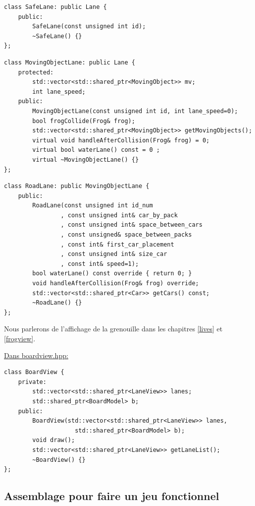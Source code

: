\documentclass[a4paper, 12pt]{article}
\begin{document}
\begin{lstlisting}
class SafeLane: public Lane {
    public:
        SafeLane(const unsigned int id);
        ~SafeLane() {}
};
\end{lstlisting}

\begin{lstlisting}
class MovingObjectLane: public Lane {
    protected:
        std::vector<std::shared_ptr<MovingObject>> mv;
        int lane_speed;
    public:
        MovingObjectLane(const unsigned int id, int lane_speed=0);
        bool frogCollide(Frog& frog);
        std::vector<std::shared_ptr<MovingObject>> getMovingObjects();
        virtual void handleAfterCollision(Frog& frog) = 0;
        virtual bool waterLane() const = 0 ;
        virtual ~MovingObjectLane() {}
};   
\end{lstlisting}

\begin{lstlisting}
class RoadLane: public MovingObjectLane {
    public:
        RoadLane(const unsigned int id_num
                , const unsigned int& car_by_pack
                , const unsigned int& space_between_cars
                , const unsigned& space_between_packs
                , const int& first_car_placement
                , const unsigned int& size_car
                , const int& speed=1);
        bool waterLane() const override { return 0; }
        void handleAfterCollision(Frog& frog) override;
        std::vector<std::shared_ptr<Car>> getCars() const;
        ~RoadLane() {}
};
\end{lstlisting}

Nous parlerons de l'affichage de la grenouille dans les chapitres \ref{lives} et \ref{frogview}.

\underline{Dans boardview.hpp:} \hspace{0.5cm}

\begin{lstlisting}
class BoardView {
    private:
        std::vector<std::shared_ptr<LaneView>> lanes;
        std::shared_ptr<BoardModel> b;
    public:
        BoardView(std::vector<std::shared_ptr<LaneView>> lanes,
                    std::shared_ptr<BoardModel> b);
        void draw();
        std::vector<std::shared_ptr<LaneView>> getLaneList();
        ~BoardView() {}
};
\end{lstlisting}


\subsection{Assemblage pour faire un jeu fonctionnel}
\end{document}
